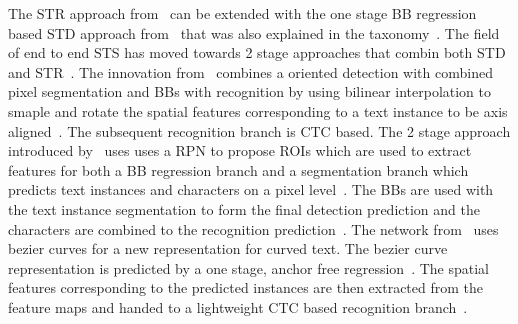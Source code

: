 The \ac{STR} approach from~\cite{shi_aster_2019} can be extended with the one stage
\ac{BB} regression based \ac{STD} approach from~\cite{liao_textboxes_2017} that was also explained
in the taxonomy~\citep{shi_aster_2019}.
The field of end to end \ac{STS} has moved towards 2 stage approaches that combin both \ac{STD}
and \ac{STR}~\citep{lyu_mask_2018,long_scene_2021}.
The innovation from~\cite{liu_fots_2018} combines a oriented detection with combined pixel
segmentation and \acp{BB} with recognition by using bilinear interpolation to smaple and rotate
the spatial features corresponding to a text instance to be axis aligned~\citep{liu_fots_2018}.
The subsequent recognition branch is \ac{CTC} based.
The 2 stage approach introduced by~\cite{lyu_mask_2018} uses uses a \ac{RPN} to propose \acp{ROI}
which are used to extract features for both a \ac{BB} regression branch and a segmentation branch
which predicts text instances and characters on a pixel level~\citep{lyu_mask_2018}.
The \acp{BB} are used with the text instance segmentation to form the final detection prediction and
the characters are combined to the recognition prediction~\citep{lyu_mask_2018}.
The network from~\cite{liu_abcnet_2020} uses bezier curves for a new representation for curved text.
The bezier curve representation is predicted by a one stage, anchor free
regression~\citep{liu_abcnet_2020}.
The spatial features corresponding to the predicted instances are then extracted from the feature
maps and handed to a lightweight \ac{CTC} based recognition branch~\citep{lyu_mask_2018}.
